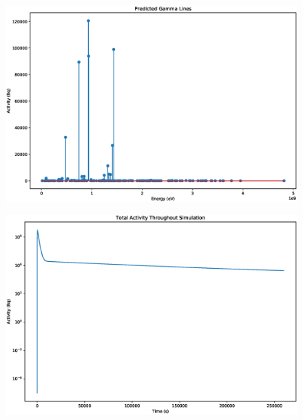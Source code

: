 \documentclass[12pt,twoside]{manual}
\begin{document}
\begin{figure}[h]
  \begin{center}
    \includegraphics[scale=0.25]{img/end_of_sim_gamma_lines.eps}
  \end{center}
\end{figure}

\begin{figure}[h]
  \begin{center}
    \includegraphics[scale=0.25]{img/total_sim_total_activity_log.eps}
  \end{center}
\end{figure}



\FloatBarrier

\end{document}
